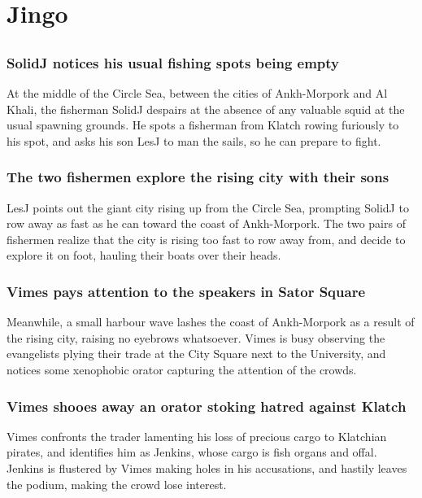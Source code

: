 \section{Jingo}


\subsection{}
\subsubsection{\Gls{SolidJ} notices his usual fishing spots being empty}
At the middle of the Circle Sea, between the cities of Ankh-Morpork and Al Khali, the fisherman
\Gls{SolidJ} despairs at the absence of any valuable squid at the usual spawning grounds. He spots
a fisherman from Klatch rowing furiously to his spot, and asks his son \Gls{LesJ} to man the sails,
so he can prepare to fight.

\subsubsection{The two fishermen explore the rising city with their sons}
\Gls{LesJ} points out the giant city rising up from the Circle Sea, prompting \Gls{SolidJ} to
row away as fast as he can toward the coast of Ankh-Morpork. The two pairs of fishermen realize
that the city is rising too fast to row away from, and decide to explore it on foot, hauling their
boats over their heads.

\subsubsection{\Gls{Vimes} pays attention to the speakers in Sator Square}
Meanwhile, a small harbour wave lashes the coast of Ankh-Morpork as a result of the rising city,
raising no eyebrows whatsoever. \Gls{Vimes} is busy observing the evangelists plying their trade at
the City Square next to the University, and notices some xenophobic orator capturing the attention
of the crowds.

\subsubsection{\Gls{Vimes} shooes away an orator stoking hatred against Klatch}
\Gls{Vimes} confronts the trader lamenting his loss of precious cargo to Klatchian pirates, and
identifies him as \Gls{Jenkins}, whose cargo is fish organs and offal. \Gls{Jenkins} is flustered
by \Gls{Vimes} making holes in his accusations, and hastily leaves the podium, making the crowd lose
interest.

